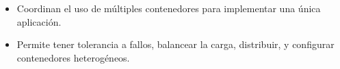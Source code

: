 \begin{itemize}
\item Coordinan el uso de múltiples contenedores para implementar una única aplicación.
\item Permite tener tolerancia a fallos, balancear la carga, distribuir, y configurar contenedores heterogéneos.
\end{itemize}




